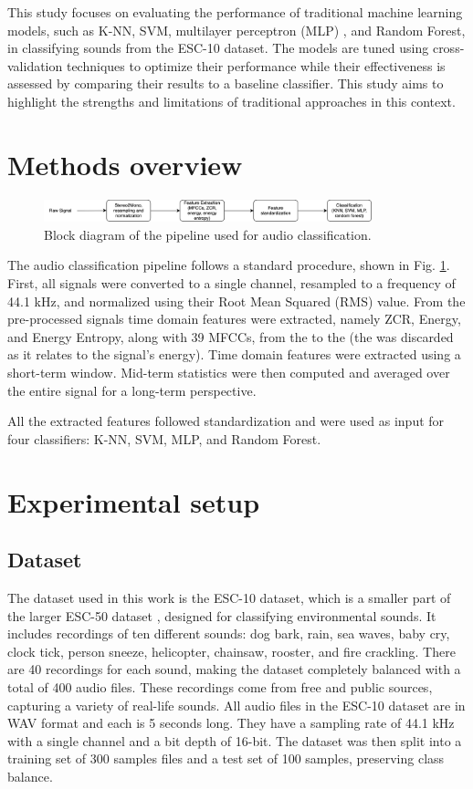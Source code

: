 \documentclass[journal]{IEEEtran}
\begin{document}
This study focuses on evaluating the performance of traditional machine learning models, such as K-NN, SVM, multilayer perceptron (MLP) , and Random Forest, in classifying sounds from the ESC-10 dataset. The models are tuned using cross-validation techniques to optimize their performance while their effectiveness is assessed by comparing their results to a baseline classifier. This study aims to highlight the strengths and limitations of traditional approaches in this context.

\section{Methods overview}

\begin{figure}[h]
    \centering
    \includegraphics[width=\linewidth, height=0.65cm]{pipeline.png}
    \caption{Block diagram of the pipeline used for audio classification.}
    \label{fig:pipeling}
\end{figure}

The audio classification pipeline follows a standard procedure, shown in Fig. \ref{fig:pipeling}. First, all signals were converted to a single channel, resampled to a frequency of 44.1 kHz, and normalized using their Root Mean Squared (RMS) value. From the pre-processed signals time domain features were extracted, namely ZCR, Energy, and Energy Entropy, along with 39 MFCCs, from the  to the  (the  was discarded as it relates to the signal's energy). Time domain features were extracted using a short-term window. Mid-term statistics were then computed and averaged over the entire signal for a long-term perspective.

All the extracted features followed standardization and were used as input for four classifiers: K-NN, SVM, MLP, and Random Forest.

\section{Experimental setup}
\subsection{Dataset}
The dataset used in this work is the ESC-10 dataset, which is a smaller part of the larger ESC-50 dataset \cite{esc-50}, designed for classifying environmental sounds. It includes recordings of ten different sounds: dog bark, rain, sea waves, baby cry, clock tick, person sneeze, helicopter, chainsaw, rooster, and fire crackling. There are 40 recordings for each sound, making the dataset completely balanced with a total of 400 audio files. These recordings come from free and public sources, capturing a variety of real-life sounds. All audio files in the ESC-10 dataset are in WAV format and each is 5 seconds long. They have a sampling rate of 44.1 kHz with a single channel and a bit depth of 16-bit.
The dataset was then split into a training set of 300 samples files and a test set of 100 samples, preserving class balance.
\end{document}
